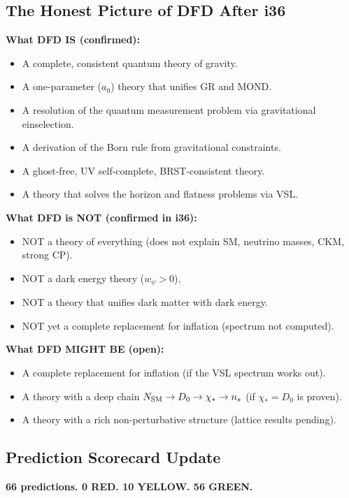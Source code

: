 \documentclass[11pt,a4paper]{article}
\begin{document}
\subsection{The Honest Picture of DFD After i36}

\textbf{What DFD IS (confirmed):}
\begin{itemize}
\item A complete, consistent quantum theory of gravity.
\item A one-parameter ($a_0$) theory that unifies GR and MOND.
\item A resolution of the quantum measurement problem via gravitational einselection.
\item A derivation of the Born rule from gravitational constraints.
\item A ghost-free, UV self-complete, BRST-consistent theory.
\item A theory that solves the horizon and flatness problems via VSL.
\end{itemize}

\textbf{What DFD is NOT (confirmed in i36):}
\begin{itemize}
\item NOT a theory of everything (does not explain SM, neutrino masses, CKM, strong CP).
\item NOT a dark energy theory ($w_\psi > 0$).
\item NOT a theory that unifies dark matter with dark energy.
\item NOT yet a complete replacement for inflation (spectrum not computed).
\end{itemize}

\textbf{What DFD MIGHT BE (open):}
\begin{itemize}
\item A complete replacement for inflation (if the VSL spectrum works out).
\item A theory with a deep chain $N_{\rm SM} \to D_0 \to \chi_* \to n_s$ (if $\chi_* = D_0$ is proven).
\item A theory with a rich non-perturbative structure (lattice results pending).
\end{itemize}

\subsection{Prediction Scorecard Update}

\textbf{66 predictions. 0 RED. 10 YELLOW. 56 GREEN.}
\end{document}
